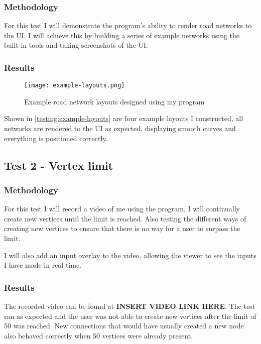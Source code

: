         \subsubsection{Methodology}

            For this test I will demonstrate the program's ability to render road networks to the UI. I will achieve this by building a series of example networks using the built-in tools and taking screenshots of the UI.

        \subsubsection{Results}

            \begin{figure}
                \centering
                \texttt{[image: example-layouts.png]}
                \caption{Example road network layouts designed using my program}
                \label{testing:example-layouts}
            \end{figure}

            Shown in \autoref{testing:example-layouts} are four example layouts I constructed, all networks are rendered to the UI as expected, displaying smooth curves and everything is positioned correctly.

    \subsection{Test 2 - Vertex limit}

        \subsubsection{Methodology}

            For this test I will record a video of me using the program, I will continually create new vertices until the limit is reached. Also testing the different ways of creating new vertices to ensure that there is no way for a user to surpass the limit.

            I will also add an input overlay to the video, allowing the viewer to see the inputs I have made in real time.

        \subsubsection{Results}

            The recorded video can be found at \textbf{INSERT VIDEO LINK HERE}. The test ran as expected and the user was not able to create new vertices after the limit of 50 was reached. New connections that would have usually created a new node also behaved correctly when 50 vertices were already present.

